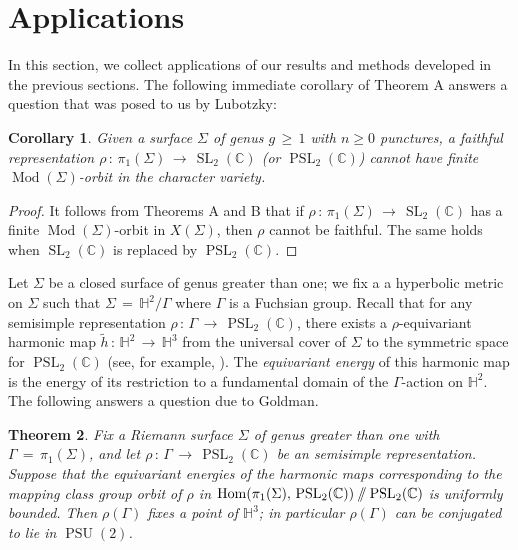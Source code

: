 \documentclass[reqno]{amsart}
\theoremstyle{plain}
\newtheorem{theorem}{Theorem}[section]
\newtheorem{corollary}[theorem]{Corollary}
\theoremstyle{definition}
\theoremstyle{remark}
\newcommand{\C}{{\mathbb{C}}}
\renewcommand{\S}{{\Sigma}}
\DeclareMathOperator{\Hom}{Hom}
\DeclareMathOperator{\Mod}{Mod}
\DeclareMathOperator{\PSL}{PSL}
\DeclareMathOperator{\PSU}{PSU}
\DeclareMathOperator{\SL}{SL}
\newcommand{\git}{\mathbin{
  \mathchoice{/\mkern-6mu/}%
    {/\mkern-6mu/}%
    {/\mkern-5mu/}%
    {/\mkern-5mu/}}}%
\newcommand\HHH{{\mathbb H}}
\begin{document}
\section{Applications}\label{sect:6}

In this section, we collect applications of our results and methods developed in the previous sections. The 
following immediate corollary of Theorem A answers a question that was posed to us by Lubotzky:

\begin{corollary}\label{faithful}
Given a surface $\Sigma$ of genus $g\,\geq\,1$ with $n\geq0$ punctures, a faithful representation
$\rho\,:\,\pi_1(\Sigma)\,\to\, \SL_2(\C)$ (or $\PSL_2(\C)$) cannot have finite $\Mod(\Sigma)$-orbit in the
character variety.
\end{corollary}

\begin{proof}
It follows from Theorems A and B that if $\rho\,:\,\pi_1(\Sigma)\,\to\, \SL_2(\C)$  has a finite
$\Mod(\Sigma)$-orbit in $X(\Sigma)$, then $\rho$ cannot be faithful. The same holds when $\SL_2(\C)$ is
replaced by $\PSL_2(\C)$.
\end{proof}

Let $\Sigma$ be a closed surface of genus greater than one; we fix a a hyperbolic metric on $\Sigma$ such that 
$\Sigma\,=\, \HHH^2/\Gamma$ where $\Gamma$ is a Fuchsian group. Recall that for any semisimple representation 
$\rho\,:\,\Gamma\,\to\, \PSL_2(\C)$, there exists a $\rho$-equivariant harmonic map $\widetilde{h}
\,:\, \HHH^2\,\to\, \HHH^3$ from 
the universal cover of $\Sigma$ to the symmetric space for $\PSL_2(\C)$ (see, for example, \cite{Donaldson}). 
The \textit{equivariant energy} of this harmonic map is the energy of its restriction to a fundamental domain 
of the $\Gamma$-action on $\HHH^2$. The following answers a question due to Goldman.

\begin{theorem}\label{energy}
Fix a Riemann surface $\S$ of genus greater than one with $\Gamma \,=\, \pi_1(\S)$, and let $\rho
\,:\,\Gamma \,\to\, \PSL_2(\C)$ be an semisimple representation. Suppose that the equivariant energies
of the harmonic maps corresponding to the mapping class group orbit of $\rho$ in
$\Hom(\pi_1(\Sigma),\,\PSL_2(\C))\git\PSL_2(\C)$ is uniformly bounded. Then $\rho(\Gamma)$ fixes a point
of $\HHH^3$; in particular $\rho(\Gamma)$ can be conjugated to lie in $\PSU(2)$.
\end{theorem}
\end{document}
